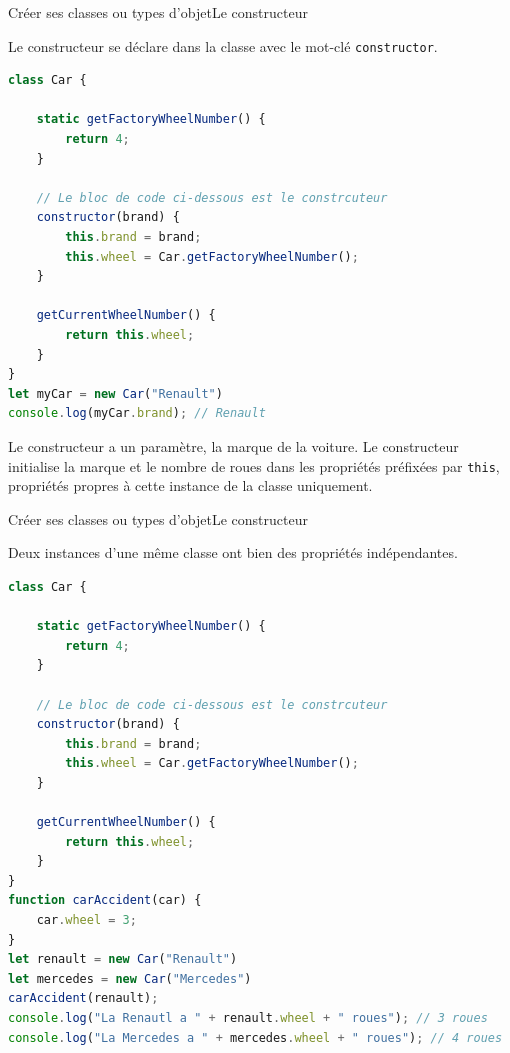 \documentclass{beamer}
\begin{document}
    \begin{frame}[fragile]{Créer ses classes ou types d'objet}{Le constructeur}
        \begin{footnotesize}
            Le constructeur se déclare dans la classe avec le mot-clé \lstinline{constructor}.
            \begin{lstlisting}[language=JavaScript,title={\scriptsize{Script JavaScript}},basicstyle=\tiny\ttfamily]
class Car {

    static getFactoryWheelNumber() {
        return 4;
    }

    // Le bloc de code ci-dessous est le constrcuteur
    constructor(brand) {
        this.brand = brand;
        this.wheel = Car.getFactoryWheelNumber();
    }

    getCurrentWheelNumber() {
        return this.wheel;
    }
}
let myCar = new Car("Renault")
console.log(myCar.brand); // Renault
            \end{lstlisting}
            Le constructeur a un paramètre, la marque de la voiture.
            Le constructeur initialise la marque et le nombre de roues dans les propriétés préfixées par \lstinline{this}, propriétés propres à cette instance de la classe uniquement.
        \end{footnotesize}
    \end{frame}

    \begin{frame}[fragile]{Créer ses classes ou types d'objet}{Le constructeur}
        \begin{footnotesize}
            Deux instances d'une même classe ont bien des propriétés indépendantes.
            \begin{lstlisting}[language=JavaScript,title={\scriptsize{Script JavaScript}},basicstyle=\tiny\ttfamily]
class Car {

    static getFactoryWheelNumber() {
        return 4;
    }

    // Le bloc de code ci-dessous est le constrcuteur
    constructor(brand) {
        this.brand = brand;
        this.wheel = Car.getFactoryWheelNumber();
    }

    getCurrentWheelNumber() {
        return this.wheel;
    }
}
function carAccident(car) {
    car.wheel = 3;
}
let renault = new Car("Renault")
let mercedes = new Car("Mercedes")
carAccident(renault);
console.log("La Renautl a " + renault.wheel + " roues"); // 3 roues
console.log("La Mercedes a " + mercedes.wheel + " roues"); // 4 roues
            \end{lstlisting}
        \end{footnotesize}
    \end{frame}
\end{document}
